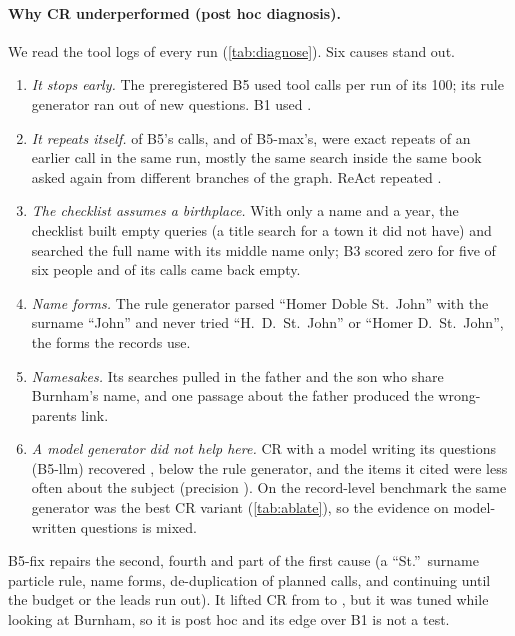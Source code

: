 \paragraph{Why CR underperformed (post hoc diagnosis).} We read the tool logs of every run (\cref{tab:diagnose}). Six causes stand out.
\begin{enumerate}
\item \emph{It stops early.} The preregistered B5 used  tool calls per run of its 100; its rule generator ran out of new questions. B1 used .
\item \emph{It repeats itself.}  of B5's calls, and  of B5-max's, were exact repeats of an earlier call in the same run, mostly the same search inside the same book asked again from different branches of the graph. ReAct repeated .
\item \emph{The checklist assumes a birthplace.} With only a name and a year, the checklist built empty queries (a title search for a town it did not have) and searched the full name with its middle name only; B3 scored zero for five of six people and  of its calls came back empty.
\item \emph{Name forms.} The rule generator parsed ``Homer Doble St.\ John'' with the surname ``John'' and never tried ``H.\ D.\ St.\ John'' or ``Homer D.\ St.\ John'', the forms the records use.
\item \emph{Namesakes.} Its searches pulled in the father and the son who share Burnham's name, and one passage about the father produced the wrong-parents link.
\item \emph{A model generator did not help here.} CR with a model writing its questions (B5-llm) recovered , below the rule generator, and the items it cited were less often about the subject (precision ). On the record-level benchmark the same generator was the best CR variant (\cref{tab:ablate}), so the evidence on model-written questions is mixed.
\end{enumerate}
B5-fix repairs the second, fourth and part of the first cause (a ``St.''\ surname particle rule, name forms, de-duplication of planned calls, and continuing until the budget or the leads run out). It lifted CR from  to , but it was tuned while looking at Burnham, so it is post hoc and its edge over B1 is not a test.

